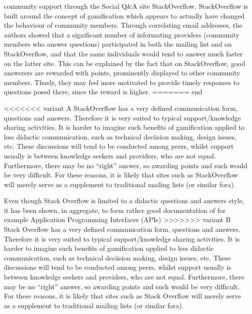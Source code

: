 \documentclass[a4paper,11pt]{article} %
\begin{document}
community support through the Social Q\&{}A site
StackOverflow. StackOverflow is built around the concept of
gamification\cite{deterding2011game} which appears to actually have
changed the behaviour of community members. Through correlating email
addresses, the authors showed that a significant number of informating
providers (community members who answer questions) participated in
both the mailing list and on StackOverflow, and that the same
individuals would tend to answer much faster on the latter site. This
can be explained by the fact that on StackOverflow, good answerers are
rewarded with points, prominently displayed to other community
members. Thusly, they may feel more motivated to provide timely
responses to questions posed there, since the reward is higher.
======= end


<<<<<<< variant A
StackOverflow has a very defined communication form, questions and
answers. Therefore it is very suited to typical support/knowledge sharing
activities. It is harder to imagine such benefits of gamification applied to
less didactic communication, such as technical deciision making, design
issues, etc. These discussions will tend to be conducted among peers, whilst
support usually is between knowledge seekers and providers, who are not
equal. Furthermore, there may be no ``right'' answer, so awarding points and
such would be very difficult. For these reasons, it is likely that sites
such as StackOverflow will merely serve as a supplement to traditional
mailing lists (or similar fora).

Even though Stack Overflow is limited to a didactic questions and answers
style, it has been shown, in aggregate, to form rather good documentation of
for example Application Programming Interfaces (APIs)
>>>>>>> variant B
Stack Overflow has a very defined communication form, questions and
answers. Therefore it is very suited to typical support/knowledge
sharing activities. It is harder to imagine such benefits of
gamification applied to less didactic communication, such as technical
deciision making, design issues, etc. These discussions will tend to
be conducted among peers, whilst support usually is between knowledge
seekers and providers, who are not equal. Furthermore, there may be no
``right'' answer, so awarding points and such would be very
difficult. For these reasons, it is likely that sites such as
Stack Overflow will merely serve as a supplement to traditional mailing
lists (or similar fora).
\end{document}
